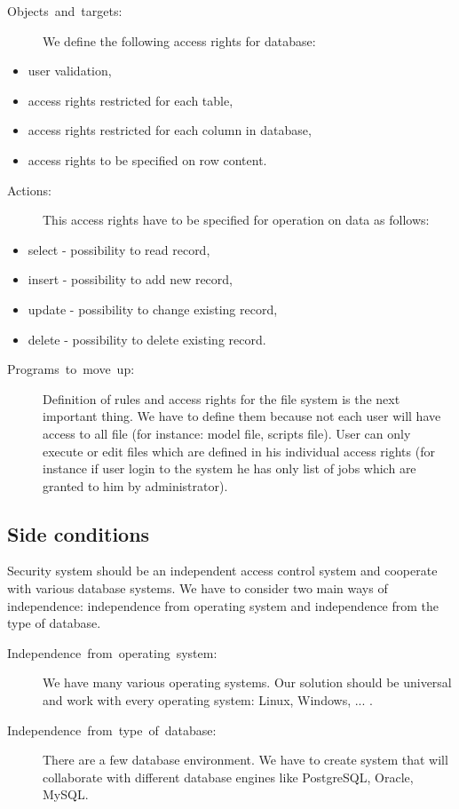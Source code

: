 \begin{description}
\item [Objects~and~targets:]We define the following access rights for
database: 
\end{description}
\begin{itemize}
\item user validation, 
\item access rights restricted for each table, 
\item access rights restricted for each column in database,
\item access rights to be specified on row content.
\end{itemize}
\begin{description}
\item [Actions:]This access rights have to be specified for operation on
data as follows:
\end{description}
\begin{itemize}
\item select - possibility to read record,
\item insert - possibility to add new record,
\item update - possibility to change existing record,
\item delete - possibility to delete existing record.
\end{itemize}
\begin{description}
\item [Programs~to~move~up:]Definition of rules and access rights for
the file system is the next important thing. We have to define them
because not each user will have access to all file (for instance:
model file, scripts file). User can only execute or edit files which
are defined in his individual access rights (for instance if user
login to the system he has only list of jobs which are granted to
him by administrator). 
\end{description}

\subsection{Side conditions }

Security system should be an independent access control system and
cooperate with various database systems. We have to consider two main
ways of independence: independence from operating system and independence
from the type of database. 

\begin{description}
\item [Independence~from~operating~system:]We have many various operating
systems. Our solution should be universal and work with every operating
system: Linux, Windows, ... . 
\item [Independence~from~type~of~database:]There are a few database
environment. We have to create system that will collaborate with different
database engines like PostgreSQL, Oracle, MySQL. 
\end{description}

